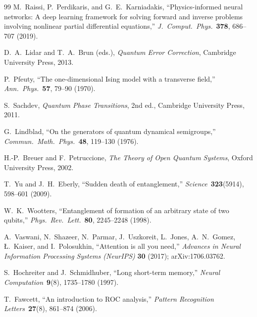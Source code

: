 \documentclass[twocolumn,10pt]{article}
\begin{document}
\begin{thebibliography}{99}
M.~Raissi, P.~Perdikaris, and G.~E.~Karniadakis,
``Physics-informed neural networks: A deep learning framework for
  solving forward and inverse problems involving nonlinear partial
  differential equations,''
\textit{J.\ Comput.\ Phys.}\ \textbf{378}, 686--707 (2019).

D.~A.~Lidar and T.~A.~Brun (eds.),
\textit{Quantum Error Correction},
Cambridge University Press, 2013.

P.~Pfeuty,
``The one-dimensional Ising model with a transverse field,''
\textit{Ann.\ Phys.}\ \textbf{57}, 79--90 (1970).

S.~Sachdev,
\textit{Quantum Phase Transitions},
2nd ed., Cambridge University Press, 2011.

G.~Lindblad,
``On the generators of quantum dynamical semigroups,''
\textit{Commun.\ Math.\ Phys.}\ \textbf{48}, 119--130 (1976).

H.-P.~Breuer and F.~Petruccione,
\textit{The Theory of Open Quantum Systems},
Oxford University Press, 2002.

T.~Yu and J.~H.~Eberly,
``Sudden death of entanglement,''
\textit{Science}\ \textbf{323}(5914), 598--601 (2009).

W.~K.~Wootters,
``Entanglement of formation of an arbitrary state of two qubits,''
\textit{Phys.\ Rev.\ Lett.}\ \textbf{80}, 2245--2248 (1998).

A.~Vaswani, N.~Shazeer, N.~Parmar, J.~Uszkoreit, L.~Jones,
A.~N.~Gomez, {\L}.~Kaiser, and I.~Polosukhin,
``Attention is all you need,''
\textit{Advances in Neural Information Processing Systems (NeurIPS)}
  \textbf{30} (2017); arXiv:1706.03762.

S.~Hochreiter and J.~Schmidhuber,
``Long short-term memory,''
\textit{Neural Computation}\ \textbf{9}(8), 1735--1780 (1997).

T.~Fawcett,
``An introduction to ROC analysis,''
\textit{Pattern Recognition Letters}\ \textbf{27}(8), 861--874 (2006).

\end{thebibliography}
\end{document}
